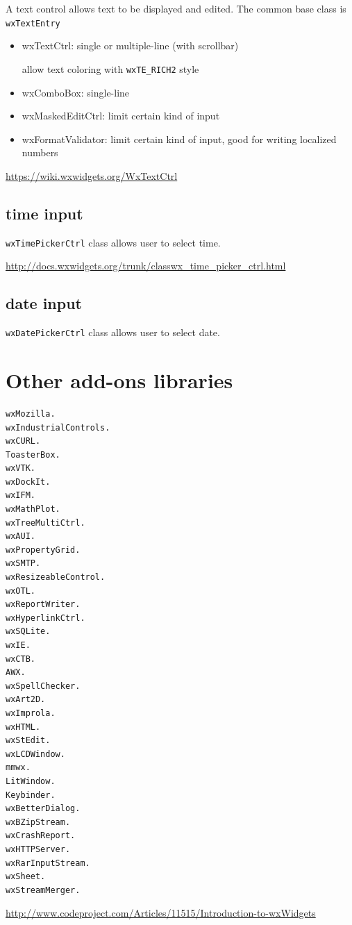 A text control allows text to be displayed and edited.
The common base class is \verb!wxTextEntry! 
\begin{itemize}
  \item wxTextCtrl: single or multiple-line (with scrollbar)
  
allow text coloring with \verb!wxTE_RICH2! style  
  
  \item wxComboBox: single-line 
  
  \item wxMaskedEditCtrl: limit certain kind of input
  
  \item wxFormatValidator: limit certain kind of input, good for writing localized numbers
\end{itemize}

\url{https://wiki.wxwidgets.org/WxTextCtrl}

\subsection{time  input}

\verb!wxTimePickerCtrl! class allows user to select time. 

\url{http://docs.wxwidgets.org/trunk/classwx_time_picker_ctrl.html}

\subsection{date input}

\verb!wxDatePickerCtrl! class allows user to select date.

\section{Other add-ons libraries}


\begin{verbatim}
wxMozilla.
wxIndustrialControls.
wxCURL.
ToasterBox.
wxVTK.
wxDockIt.
wxIFM.
wxMathPlot.
wxTreeMultiCtrl.
wxAUI.
wxPropertyGrid.
wxSMTP.
wxResizeableControl.
wxOTL.
wxReportWriter.
wxHyperlinkCtrl.
wxSQLite.
wxIE.
wxCTB.
AWX.
wxSpellChecker.
wxArt2D.
wxImprola.
wxHTML.
wxStEdit.
wxLCDWindow.
mmwx.
LitWindow.
Keybinder.
wxBetterDialog.
wxBZipStream.
wxCrashReport.
wxHTTPServer.
wxRarInputStream.
wxSheet.
wxStreamMerger.
\end{verbatim}
\url{http://www.codeproject.com/Articles/11515/Introduction-to-wxWidgets}